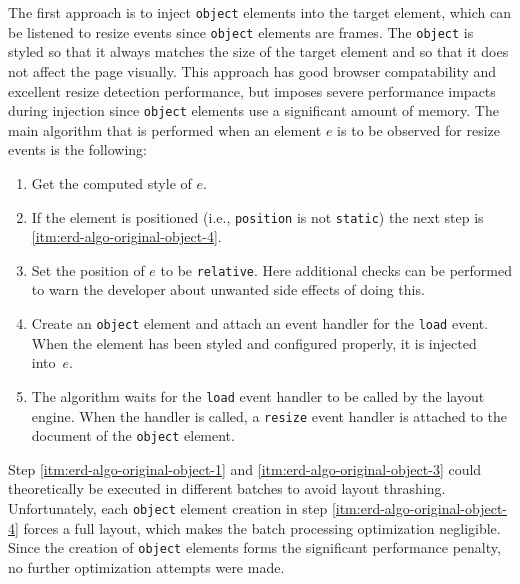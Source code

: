 \documentclass{acm_proc_article-sp}
\newcommand{\code}[1]{\texttt{#1}}
\newcommand{\gls}[1]{#1}
\begin{document}
    The first approach is to inject \code{object} elements into the target element, which can be listened to resize events since \code{object} elements are frames.
    The \code{object} is styled so that it always matches the size of the target \gls{element} and so that it does not affect the page visually.
    This approach has good browser compatability and excellent resize detection performance, but imposes severe performance impacts during injection since \code{object} elements use a significant amount of memory.
    The main algorithm that is performed when an element $e$ is to be observed for resize events is the following:
    \begin{enumerate}
      \item\label{itm:erd-algo-original-object-1} Get the computed style of $e$.
      \item                                       If the element is positioned (i.e., \code{position} is not \code{static}) the next step is \ref{itm:erd-algo-original-object-4}.
      \item\label{itm:erd-algo-original-object-3} Set the position of $e$ to be \code{relative}. Here additional checks can be performed to warn the developer about unwanted side effects of doing this.
      \item\label{itm:erd-algo-original-object-4} Create an \code{object} element and attach an event handler for the \code{load} event. When the element has been styled and configured properly, it is injected into~$e$.
      \item                                       The algorithm waits for the \code{load} event handler to be called by the \gls{layout engine}. When the handler is called, a \code{resize} event handler is attached to the \gls{document} of the \code{object} \gls{element}.
    \end{enumerate}

    Step \ref{itm:erd-algo-original-object-1} and \ref{itm:erd-algo-original-object-3} could theoretically be executed in different batches to avoid \gls{layout thrashing}.
    Unfortunately, each \code{object} element creation in step \ref{itm:erd-algo-original-object-4} forces a full layout, which makes the batch processing optimization negligible.
    Since the creation of \code{object} elements forms the significant performance penalty, no further optimization attempts were made.
\end{document}
